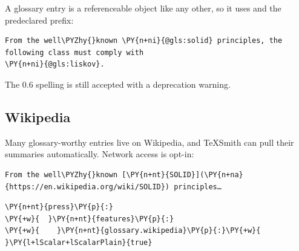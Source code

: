 \documentclass[a4paper,twoside]{article}
\begin{document}
A glossary entry is a referenceable object like any other, so it uses  and
the predeclared  prefix:
\begin{tscode}[lang=md, engine=pygments]
\begin{Verbatim}[commandchars=\\\{\},breaklines, breakanywhere, commandchars=\\\{\}]
From the well\PYZhy{}known \PY{n+ni}{@gls:solid} principles, the following class must comply with
\PY{n+ni}{@gls:liskov}.
\end{Verbatim}
\end{tscode}
The 0.6 spelling  is still accepted with a deprecation warning.
\subsection{Wikipedia}
Many glossary-worthy entries live on Wikipedia, and TeXSmith can pull their
summaries automatically. Network access is opt-in:
\begin{tscode}[lang=md, engine=pygments]
\begin{Verbatim}[commandchars=\\\{\},breaklines, breakanywhere, commandchars=\\\{\}]
From the well\PYZhy{}known [\PY{n+nt}{SOLID}](\PY{n+na}{https://en.wikipedia.org/wiki/SOLID}) principles…
\end{Verbatim}
\end{tscode}
\begin{tscode}[lang=yaml, engine=pygments]
\begin{Verbatim}[commandchars=\\\{\},breaklines, breakanywhere, commandchars=\\\{\}]
\PY{n+nt}{press}\PY{p}{:}
\PY{+w}{  }\PY{n+nt}{features}\PY{p}{:}
\PY{+w}{    }\PY{n+nt}{glossary.wikipedia}\PY{p}{:}\PY{+w}{ }\PY{l+lScalar+lScalarPlain}{true}
\end{Verbatim}
\end{tscode}
\end{document}
